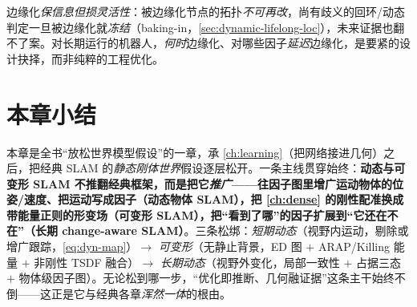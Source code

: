 \begin{pitfall}
边缘化\emph{保信息但损灵活性}：被边缘化节点的拓扑\emph{不可再改}，尚有歧义的回环/动态判定一旦被边缘化就\emph{冻结}（baking-in，\cref{sec:dynamic-lifelong-loc}），未来证据也翻不了案。对长期运行的机器人，\emph{何时}边缘化、对哪些因子\emph{延迟}边缘化，是要紧的设计抉择，而非纯粹的工程优化。
\end{pitfall}

\section*{本章小结}

本章是全书“放松世界模型假设”的一章，承 \cref{ch:learning}（把网络接进几何）之后，把经典 SLAM 的\emph{静态刚体世界}假设逐层松开。一条主线贯穿始终：\textbf{动态与可变形 SLAM 不推翻经典框架，而是把它\emph{推广}——往因子图里增广运动物体的位姿/速度、把运动写成因子（动态物体 SLAM），把 \cref{ch:dense} 的刚性配准换成带能量正则的形变场（可变形 SLAM），把“看到了哪”的因子扩展到“它还在不在”（长期 change-aware SLAM）}。三条松绑：\emph{短期动态}（视野内运动，剔除或增广跟踪，\cref{eq:dyn-map}）$\to$ \emph{可变形}（无静止背景，ED 图 $+$ ARAP/Killing 能量 $+$ 非刚性 TSDF 融合）$\to$ \emph{长期动态}（视野外变化，局部一致性 $+$ 占据三态 $+$ 物体级因子图）。无论松到哪一步，“优化即推断、几何融证据”这条主干始终不倒——这正是它与经典各章\emph{浑然一体}的根由。


